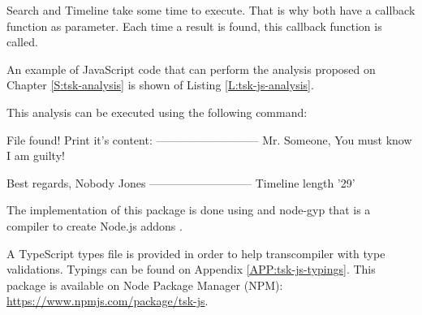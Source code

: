 Search and Timeline take some time to execute. That is why both have a callback
function as parameter. Each time a result is found, this callback function is
called.

An example of JavaScript code that can perform the analysis proposed on 
Chapter \ref{S:tsk-analysis} is shown of Listing \ref{L:tsk-js-analysis}.

\begin{codefigure}
\end{codefigure}

This analysis can be executed using the following command:

\begin{terminal}[caption=Execute The Sleuth Kit JavaScript analysis
,label=L:tsk-js-execute-analysis]
%
%
File found!
Print it's content:
---------------------------
Mr. Someone,
You must know I am guilty!

Best regards,
Nobody Jones
---------------------------
Timeline length '29'

\end{terminal}

The implementation of this package is done using \CC and node-gyp that is a 
compiler to create Node.js addons \cite{node-gyp-github}.


A TypeScript types file is provided in order to help transcompiler with type 
validations. Typings can be found on Appendix \ref{APP:tsk-js-typings}.
This package is available on Node Package Manager (NPM):
\url{https://www.npmjs.com/package/tsk-js}.

